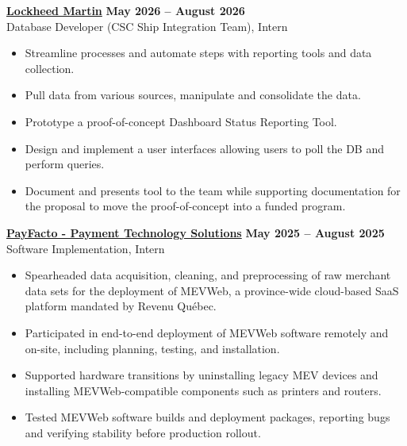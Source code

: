 \documentclass[10pt]{article}
\begin{document}
{\href{https://www.lockheedmartin.com}{\textbf{Lockheed Martin}}} \hfill \textbf{ May 2026 -- August 2026} \\
{Database Developer (CSC Ship Integration Team), Intern}
\vspace{-3mm}
\begin{itemize}[left=0.15in, itemsep=0pt]
    \item Streamline processes and automate steps with reporting tools and data collection.
    \item Pull data from various sources, manipulate and consolidate the data.
    \item Prototype a proof-of-concept Dashboard Status Reporting Tool.
    \item Design and implement a user interfaces allowing users to poll the DB and perform queries.
    \item Document and presents tool to the team while supporting documentation for the proposal to move the proof-of-concept into a funded program.
\end{itemize}

{\href{https://www.payfacto.com}{\textbf{PayFacto - Payment Technology Solutions}}} \hfill \textbf{May 2025 -- August 2025} \\
{Software Implementation, Intern }
\vspace{-3mm}
\begin{itemize}[left=0.15in, itemsep=0pt]
    \item Spearheaded data acquisition, cleaning, and preprocessing of raw merchant data sets for the deployment of MEVWeb, a province-wide cloud-based SaaS platform mandated by Revenu Québec.
    \item Participated in end-to-end deployment of MEVWeb software remotely and on-site, including planning, testing, and installation.
    \item Supported hardware transitions by uninstalling legacy MEV devices and installing MEVWeb-compatible components such as printers and routers.
    \item Tested MEVWeb software builds and deployment packages, reporting bugs and verifying stability before production rollout.
\end{itemize}
\end{document}
